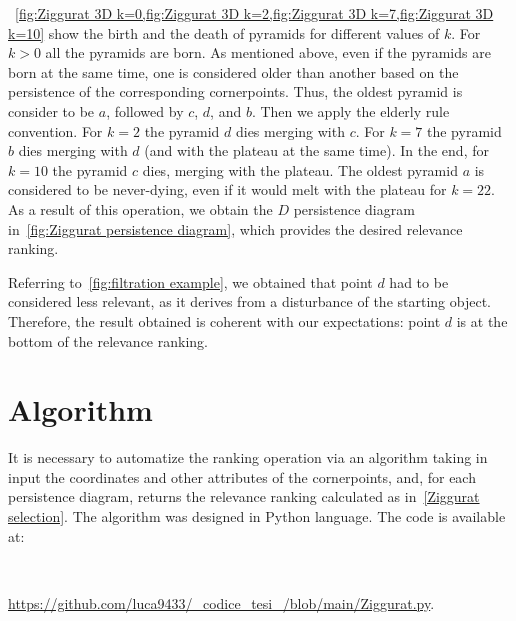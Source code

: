 \documentclass[english, LaM, oneside, noexaminfo]{sapthesis}
\begin{document}
~\cref{fig:Ziggurat 3D k=0,fig:Ziggurat 3D k=2,fig:Ziggurat 3D k=7,fig:Ziggurat 3D k=10} show the birth and the death of pyramids for different values of $k$. For $k>0$ all the
pyramids are born. As mentioned above, even if the pyramids are born at the same time,
one is considered older than another based on the persistence of the corresponding cornerpoints. Thus, the oldest pyramid is consider to be
$a$, followed by $c$, $d$, and $b$. Then we apply the elderly rule convention.
For $k = 2$ the pyramid $d$ dies merging with $c$. For $k = 7$ the pyramid $b$ dies merging with $d$ (and with the plateau at the same time). In the end, for $ k = 10$ the pyramid $c$ dies, merging with the plateau.
The oldest pyramid $a$ is considered to be never-dying, even if it would melt with the plateau for $ k = 22$. As a result of this operation, we obtain the $D$ persistence diagram in~\cref{fig:Ziggurat persistence diagram}, which provides the desired relevance ranking.


Referring to~\cref{fig:filtration example}, we obtained that point $d$ had to be
considered less relevant, as it derives from a disturbance of the starting object. Therefore, the result obtained is coherent with our expectations: point $d$ is at the bottom of the relevance ranking.


\section{Algorithm}

It is necessary to automatize the ranking operation via
an algorithm taking in input the coordinates and other attributes of the cornerpoints, and, for
each persistence diagram, returns the relevance ranking calculated as in~\cref{Ziggurat selection}. The algorithm was designed in Python language. The code is
available at:

\

\href{https://github.com/luca9433/_codice_tesi_/blob/main/Ziggurat.py}{https://github.com/luca9433/_codice_tesi_/blob/main/Ziggurat.py}.
\end{document}
